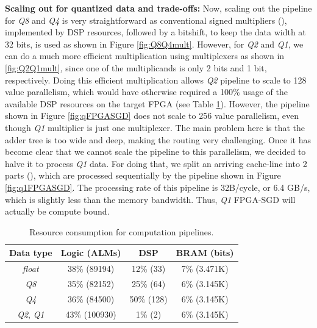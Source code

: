 \documentclass{article}
\newcommand*\circled[1]{\tikz[baseline=(char.base)]{
\node[shape=circle,draw,color=black,text=black,inner sep=0.05pt](char){#1};}}
\begin{document}
\noindent
\textbf{Scaling out for quantized data and trade-offs:} Now, scaling out the pipeline for \textit{Q8} and \textit{Q4} is very straightforward as conventional signed multipliers (\circled{3}), implemented by DSP resources, followed by a bitshift, to keep the data width at 32 bits, is used as shown in Figure \ref{fig:Q8Q4mult}. However, for \textit{Q2} and \textit{Q1}, we can do a much more efficient multiplication using multiplexers as shown in \ref{fig:Q2Q1mult}, since one of the multiplicands is only 2 bits and 1 bit, respectively. Doing this efficient multiplication allows \textit{Q2} pipeline to scale to 128 value parallelism, which would have otherwise required a 100\% usage of the available DSP resources on the target FPGA (see Table \ref{table:resources}). However, the pipeline shown in Figure \ref{fig:qFPGASGD} does not scale to 256 value parallelism, even though \textit{Q1} multiplier is just one multiplexer. The main problem here is that the adder tree is too wide and deep, making the routing very challenging. Once it has become clear that we cannot scale the pipeline to this parallelism, we decided to halve it to process \textit{Q1} data. For doing that, we split an arriving cache-line into 2 parts (\circled{4}), which are processed sequentially by the pipeline shown in Figure \ref{fig:q1FPGASGD}. The processing rate of this pipeline is 32B/cycle, or 6.4 GB/s, which is slightly less than the memory bandwidth. Thus, \textit{Q1} FPGA-SGD will actually be compute bound.
{\tiny
\begin{table}[t]
\centering
\caption{Resource consumption for computation pipelines.}
\label{table:resources}
\begin{tabular}{c|c|c|c}
Data type & Logic (ALMs) & DSP & BRAM (bits)\\
\hline
\textit{float} & 38\% (89194) & 12\% (33) & 7\% (3.471K) \\
\textit{Q8} & 35\% (82152) & 25\% (64) & 6\% (3.145K) \\
\textit{Q4} & 36\% (84500) & 50\% (128) & 6\% (3.145K) \\
\textit{Q2}, \textit{Q1} & 43\% (100930) & 1\% (2) & 6\% (3.145K) %
\end{tabular}
\end{table}
}




\cleardoublepage



\end{document}
